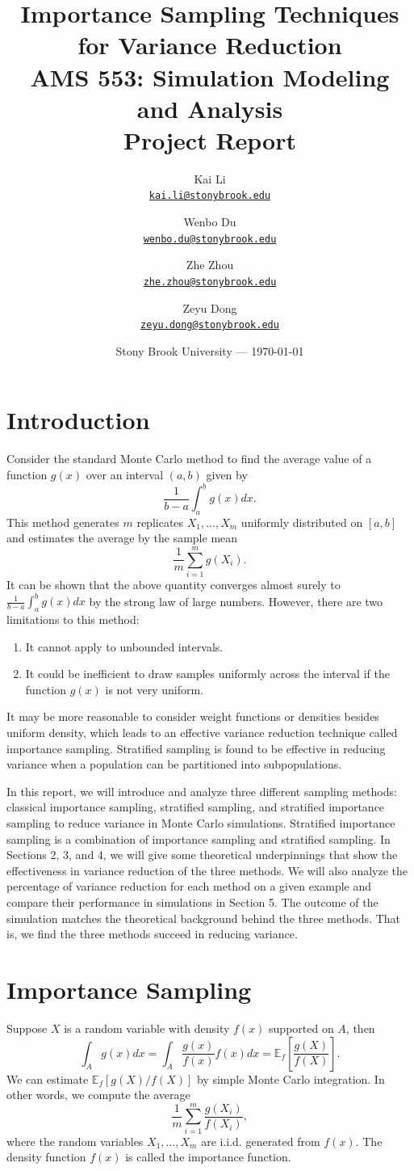 \documentclass[11pt]{article}
\title{\textbf{Importance Sampling Techniques for Variance Reduction}\\AMS 553: Simulation Modeling and Analysis\\Project Report}
\author{Kai Li\\\href{mailto:kai.li@stonybrook.edu}{\texttt{kai.li@stonybrook.edu}} \and Wenbo Du\\\href{mailto:wenbo.du@stonybrook.edu}{\texttt{wenbo.du@stonybrook.edu}} \and Zhe Zhou\\\href{mailto:zhe.zhou@stonybrook.edu}{\texttt{zhe.zhou@stonybrook.edu}} \and Zeyu Dong\\\href{mailto:zeyu.dong@stonybrook.edu}{\texttt{zeyu.dong@stonybrook.edu}}}
\date{Stony Brook University --- \today}
\begin{document}
\maketitle

\section{Introduction}
Consider the standard Monte Carlo method to find the average value of a function $g(x)$ over an interval $(a, b)$ given by
\[
\frac{1}{b-a} \int_{a}^{b} g(x) dx.
\]
This method generates $m$ replicates $X_{1}, \ldots, X_{m}$ uniformly distributed on $[a, b]$ and estimates the average by the sample mean
\[
\frac{1}{m}\sum_{i=1}^{m} g(X_{i}).
\]
It can be shown that the above quantity converges almost surely to $\frac{1}{b-a}\int_{a}^{b} g(x) dx$ by the strong law of large numbers. However, there are two limitations to this method:
\begin{enumerate}
\item It cannot apply to unbounded intervals.
\item It could be inefficient to draw samples uniformly across the interval if the function $g(x)$ is not very uniform.
\end{enumerate}
It may be more reasonable to consider weight functions or densities besides uniform density, which leads to an effective variance reduction technique called importance sampling. Stratified sampling is found to be effective in reducing variance when a population can be partitioned into subpopulations.

In this report, we will introduce and analyze three different sampling methods: classical importance sampling, stratified sampling, and stratified importance sampling to reduce variance in Monte Carlo simulations. Stratified importance sampling is a combination of importance sampling and stratified sampling. In Sections 2, 3, and 4, we will give some theoretical underpinnings that show the effectiveness in variance reduction of the three methods. We will also analyze the percentage of variance reduction for each method on a given example and compare their performance in simulations in Section 5. The outcome of the simulation matches the theoretical background behind the three methods. That is, we find the three methods succeed in reducing variance.

\section{Importance Sampling}
Suppose $X$ is a random variable with density $f(x)$ supported on $A$, then
\[
\int_A g(x) dx = \int_A \frac{g(x)}{f(x)} f(x) dx = \mathbb{E}_f\left[\frac{g(X)}{f(X)}\right].
\]
We can estimate $\mathbb{E}_f[g(X)/f(X)]$ by simple Monte Carlo integration. In other words, we compute the average
\[
\frac{1}{m} \sum_{i=1}^{m} \frac{g\left(X_{i}\right)}{f\left(X_{i}\right)},
\]
where the random variables $X_{1}, \ldots, X_{m}$ are i.i.d. generated from $f(x)$. The density function $f(x)$ is called the importance function.
\end{document}

